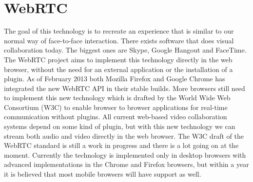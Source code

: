 \section{WebRTC}
The goal of this technology is to recreate an experience that is similar to our normal way of face-to-face interaction. There exists software that does visual collaboration today. The biggest ones are Skype, Google Hangout and FaceTime. The WebRTC project aims to implement this technology directly in the web browser, without the need for an external application or the installation of a plugin. As of February 2013 both Mozilla Firefox and Google Chrome has integrated the new WebRTC API in their stable builds. More browsers still need to implement this new technology which is drafted by the World Wide Web Consortium (W3C) to enable browser to browser applications for real-time communication without plugins. All current web-based video collaboration systems depend on some kind of plugin, but with this new technology we can stream both audio and video directly in the web browser. The W3C draft of the WebRTC standard is still a work in progress and there is a lot going on at the moment. Currently the technology is implemented only in desktop browsers with advanced implementations in the Chrome and Firefox browsers, but within a year it is believed that most mobile browsers will have support as well.

